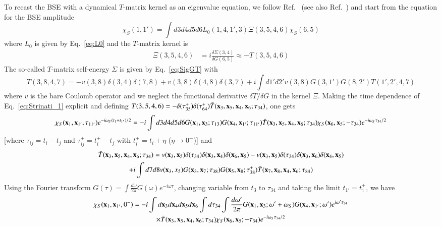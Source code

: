 \documentclass[aip,jcp,reprint,noshowkeys,superscriptaddress]{revtex4-1}
\newcommand{\bx}{\mathbf{x}}
\begin{document}
To recast the BSE with a dynamical $T$-matrix kernel as an eigenvalue equation, we follow Ref.~ (see also Ref.~) and start from the equation for the BSE amplitude 
\begin{equation}
\label{eq:Strinati_1}
	\chi_S(1,1') = \int d3d4d5d6L_0(1,4,1',3)\Xi(3,5,4,6) \chi_S(6,5)
\end{equation}
where $L_0$ is given by Eq.~\eqref{eq:L0} and the $T$-matrix kernel is
\begin{align}
\label{eq:T-matrix_kernel}
	\Xi(3,5,4,6) & =  i\frac{\delta \Sigma(3,4)}{\delta G(6,5)}\approx -T(3,5,4,6)
\end{align}
The so-called $T$-matrix self-energy $\Sigma$ is given by Eq.~\eqref{eq:SigGT} with \cite{Martin_2016,Romaniello_2012}
\begin{equation}
\label{eq:T-matrix}
	T(3,8,4,7) =
	- v(3,8)\delta(3,4)\delta(7,8)
	+ v(3,8)\delta(4,8)\delta(3,7)
	+ i \int d1'd2' v(3,8)G(3,1')G(8,2')T(1',2',4,7)
\end{equation}  
where $v$ is the bare Coulomb operator and we neglect the functional derivative $\delta T/\delta G$ in the kernel $\Xi$.
Making the time dependence of Eq.~\eqref{eq:Strinati_1} explicit and defining $T(3,5,4,6)=- \delta(\tau^+_{35})\delta(\tau^+_{64})\Bar{T}(\bx_3,\bx_5,\bx_4,\bx_6;\tau_{34})$, one gets 
\begin{equation}
\label{eq:DYN_T}
	\chi_S(\bx_1,\bx_{1'},\tau_{11'})e^{-i\omega_S(t_1+t_{1'})/2}
	=-i\int d3d4d5d6 G(\bx_1,\bx_3;\tau_{13})G(\bx_4,\bx_{1'};\tau_{11'})
	\Bar{T}(\bx_3,\bx_5,\bx_4,\bx_6;\tau_{34})\chi_S(\bx_6,\bx_5;-\tau_{34})e^{-i\omega_S\tau_{34}/2}
\end{equation}
[where $\tau_{ij}=t_i-t_j$ and $\tau^+_{ij}=t^+_i-t_j$ with $t^+_i=t_i+\eta$ ($\eta \to 0^+$)] and
\begin{multline}
\label{eq:T_bar}
	\Bar{T}(\bx_3,\bx_5,\bx_4,\bx_6;\tau_{34}) 
	= v(\bx_3,\bx_5)\delta(\tau_{34})\delta(\bx_3,\bx_4)\delta(\bx_6,\bx_5)-v(\bx_3,\bx_5)\delta(\tau_{34})	\delta(\bx_3,\bx_6)\delta(\bx_4,\bx_5)
	\\
	+ i \int d7 d8 v(\bx_3,x_5)G(\bx_3,\bx_7;\tau_{38})G(\bx_5,\bx_8;\tau^+_{38})\Bar{T}(\bx_7,\bx_8,\bx_4,\bx_6;\tau_{84})
\end{multline}
Using the Fourier transform $G(\tau)=\int \frac{d\omega}{2\pi}G(\omega)e^{-i\omega\tau}$, changing variable from $t_3$ to $\tau_{34}$ and taking the limit $t_{1'}=t_1^+$, we have
\begin{multline}
	\chi_S(\bx_1,\bx_{1'},0^-)
	= -i\int d\bx_3 d\bx_4 d\bx_5 d\bx_6\int d\tau_{34} \int \frac{d\omega'}{2\pi}G(\bx_1,\bx_3;\omega'+\omega_S)G(\bx_4,\bx_{1'};\omega')e^{i\omega'\tau_{34}}
	\\
	 \times \Bar{T}(\bx_3,\bx_5,\bx_4,\bx_6;\tau_{34})\chi_S(\bx_6,\bx_5;-\tau_{34})e^{-i\omega_S\tau_{34}/2}
\end{multline}
\end{document}

